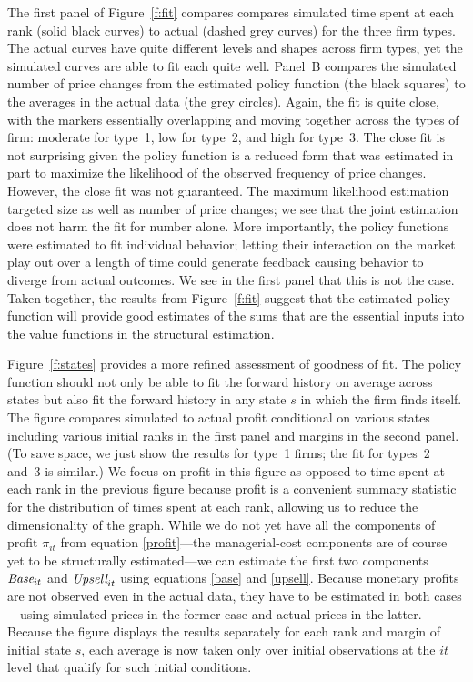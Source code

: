\documentclass[11pt]{article}
\newcommand{\Base}{\mbox{\it Base}}
\newcommand{\Upsell}{\mbox{\it Upsell}}
\begin{document}
\begin{spacing}{1.3}
The first panel of Figure~\ref{f:fit} compares compares simulated time
spent at each rank (solid black curves) to actual (dashed grey curves)
for the three firm types. The actual curves have quite different
levels and shapes across firm types, yet the simulated curves are able
to fit each quite well. Panel~B compares the simulated number of price
changes from the estimated policy function (the black squares) to the
averages in the actual data (the grey circles). Again, the fit is
quite close, with the markers essentially overlapping and moving
together across the types of firm: moderate for type~1, low for
type~2, and high for type~3. The close fit is not surprising given the
policy function is a reduced form that was estimated in part to
maximize the likelihood of the observed frequency of price
changes. However, the close fit was not guaranteed. The maximum
likelihood estimation targeted size as well as number of price
changes; we see that the joint estimation does not harm the fit for
number alone. More importantly, the policy functions were estimated to
fit individual behavior; letting their interaction on the market play
out over a length of time could generate feedback causing behavior to
diverge from actual outcomes. We see in the first panel that this is
not the case.  Taken together, the results from Figure~\ref{f:fit}
suggest that the estimated policy function will provide good estimates
of the sums that are the essential inputs into the value functions in
the structural estimation.

Figure~\ref{f:states} provides a more refined assessment of goodness
of fit. The policy function should not only be able to fit the forward
history on average across states but also fit the forward history in
any state $s$ in which the firm finds itself. The figure compares
simulated to actual profit conditional on various states including
various initial ranks in the first panel and margins in the second
panel. (To save space, we just show the results for type~1 firms; the
fit for types~2 and~3 is similar.)  We focus on profit in this figure
as opposed to time spent at each rank in the previous figure because
profit is a convenient summary statistic for the distribution of times
spent at each rank, allowing us to reduce the dimensionality of the
graph. While we do not yet have all the components of profit
$\pi_{it}$ from equation \eqref{profit}---the managerial-cost
components are of course yet to be structurally estimated---we can
estimate the first two components $\Base_{it}$ and $\Upsell_{it}$
using equations \eqref{base} and \eqref{upsell}. Because monetary
profits are not observed even in the actual data, they have to be
estimated in both cases---using simulated prices in the former case
and actual prices in the latter. Because the figure displays the
results separately for each rank and margin of initial state $s$,
each average is now taken only over initial observations at the $it$ level that qualify
for such initial conditions.


\end{spacing}
\end{document}
